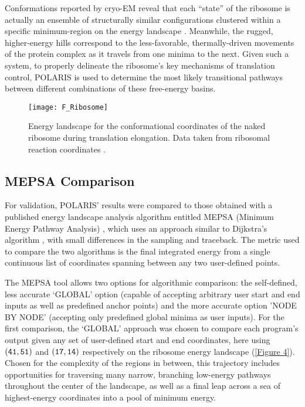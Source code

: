 \documentclass[twocolumn]{biophys-new}
\begin{document}
Conformations reported by cryo-EM reveal that each ``state'' of the ribosome is actually an ensemble of structurally similar configurations clustered within a specific minimum-region on the energy landscape \cite{whitford24}. Meanwhile, the rugged, higher-energy hills correspond to the less-favorable, thermally-driven movements of the protein complex as it travels from one minima to the next.  Given such a system, to properly delineate the ribosome's key mechanisms of translation control, POLARIS is used to determine the most likely transitional pathways between different combinations of these free-energy basins.

\setcounter{figure}{3} 
\begin{figure}[hbt!]
\centering
\texttt{[image: F\_Ribosome]}
\caption{Energy landscape for the conformational coordinates of the naked ribosome during translation elongation. Data taken from ribosomal reaction coordinates \cite{dashti}.}
\label{Figure 4}
\end{figure}

\subsection*{MEPSA Comparison}

For validation, POLARIS' results were compared to those obtained with a published energy landscape analysis algorithm entitled MEPSA (Minimum Energy Pathway Analysis) \cite{mepsa}, which uses an approach similar to Dijkstra's algorithm \cite{dijkstra}, with small differences in the sampling and traceback. The metric used to compare the two algorithms is the final integrated energy from a single continuous list of coordinates spanning between any two user-defined points.

The MEPSA tool allows two options for algorithmic comparison: the self-defined, less accurate `GLOBAL' option (capable of accepting arbitrary user start and end inputs as well as predefined anchor points) and the more accurate option 'NODE BY NODE' (accepting only predefined global minima as user inputs). For the first comparison, the `GLOBAL' approach was chosen to compare each program's output given any set of user-defined start and end coordinates, here using $\tt{(41, 51)}$ and $\tt{(17, 14)}$ respectively on the ribosome energy landscape (\autoref{Figure 4}). Chosen for the complexity of the regions in between, this trajectory includes opportunities for traversing many narrow, branching low-energy pathways throughout the center of the landscape, as well as a final leap across a sea of highest-energy coordinates into a pool of minimum energy.
\end{document}
